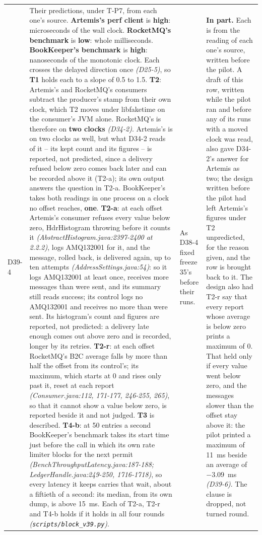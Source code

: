 \documentclass[11pt]{article}
\newcommand{\gl}[1]{{\color{soft}\itshape\small (#1)}}
\begin{document}
{\begin{longtable}{@{}p{1.1cm} >{\raggedright\arraybackslash}p{6.1cm} >{\raggedright\arraybackslash}p{6.0cm} >{\raggedright\arraybackslash}p{2.2cm}@{}}
D39-4 & Their predictions, under T-P7, from each one's source. \textbf{Artemis's perf client} is \textbf{high}: microseconds of the wall clock. \textbf{RocketMQ's benchmark} is \textbf{low}: whole milliseconds. \textbf{BookKeeper's benchmark} is \textbf{high}: nanoseconds of the monotonic clock. Each crosses the delayed direction once \gl{D25-5}, so \textbf{T1} holds each to a slope of 0.5 to 1.5. \textbf{T2}: Artemis's and RocketMQ's consumers subtract the producer's stamp from their own clock, which T2 moves under libfaketime on the consumer's JVM alone. RocketMQ's is therefore on \textbf{two clocks} \gl{D34-2}. Artemis's is on two clocks as well, but what D34-2 reads of it -- its kept count and its figures -- is reported, not predicted, since a delivery refused below zero comes back later and can be recorded above it (T2-a); its own output answers the question in T2-a. BookKeeper's takes both readings in one process on a clock no offset reaches, \textbf{one}. \textbf{T2-a}: at each offset Artemis's consumer refuses every value below zero, HdrHistogram throwing before it counts it \gl{AbstractHistogram.java:2397-2400 at 2.2.2}, logs AMQ132001 for it, and the message, rolled back, is delivered again, up to ten attempts \gl{AddressSettings.java:54}: so it logs AMQ132001 at least once, receives more messages than were sent, and its summary still reads success; its control logs no AMQ132001 and receives no more than were sent. Its histogram's count and figures are reported, not predicted: a delivery late enough comes out above zero and is recorded, longer by its retries. \textbf{T2-r}: at each offset RocketMQ's B2C average falls by more than half the offset from its control's; its maximum, which starts at 0 and rises only past it, reset at each report \gl{Consumer.java:112, 171-177, 246-255, 265}, so that it cannot show a value below zero, is reported beside it and not judged. \textbf{T3} is described. \textbf{T4-b}: at 50 entries a second BookKeeper's benchmark takes its start time just before the call in which its own rate limiter blocks for the next permit \gl{BenchThroughputLatency.java:187-188; LedgerHandle.java:249-250, 1716-1718}, so every latency it keeps carries that wait, about a fiftieth of a second: its median, from its own dump, is above 15~ms. Each of T2-a, T2-r and T4-b holds if it holds in all four rounds \gl{\texttt{scripts/block\_v39.py}}. & As D38-4 fixed freeze 35's before their runs. & \textbf{In part.} Each is from the reading of each one's source, written before the pilot. A draft of this row, written while the pilot ran and before any of its runs with a moved clock was read, also gave D34-2's answer for Artemis as two; the design written before the pilot had left Artemis's figures under T2 unpredicted, for the reason given, and the row is brought back to it. The design also had T2-r say that every report whose average is below zero prints a maximum of 0. That held only if every value went below zero, and the messages slower than the offset stay above it: the pilot printed a maximum of 11~ms beside an average of $-3.09$~ms \gl{D39-6}. The clause is dropped, not turned round. \\

\end{longtable}}
\end{document}
